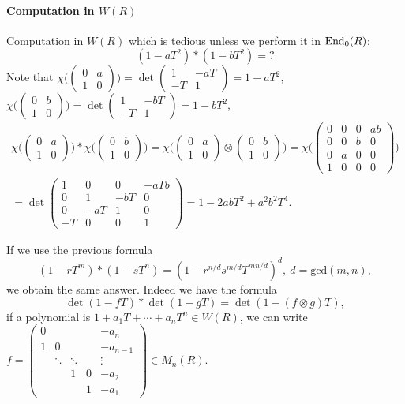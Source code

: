 \paragraph{Computation in $W(R)$}
Computation in $W(R)$ which is tedious unless we perform it in $\mathrm{End}_0(R)$:
\[(1-aT^2)*(1-bT^2)=?\]
Note that $\chi\Big(\begin{pmatrix}
	0&a \\1&0
\end{pmatrix}\Big)=\det \begin{pmatrix}
	1&-aT\\-T &1
\end{pmatrix} =1-aT^2$, $\chi\Big(\begin{pmatrix}
	0&b \\1&0
\end{pmatrix}\Big)=\det \begin{pmatrix}
	1&-bT\\-T &1
\end{pmatrix} =1-bT^2$,
\begin{gather*}
	\chi\Big(\begin{pmatrix}
	0&a \\1&0
\end{pmatrix}\Big)*\chi\Big(\begin{pmatrix}
	0&b \\1&0
\end{pmatrix}\Big)=\chi\Big(\begin{pmatrix}
	0&a \\1&0
\end{pmatrix}\otimes \begin{pmatrix}
	0&b \\1&0
\end{pmatrix} \Big)=\chi \Big(\begin{pmatrix}
	0 &0&0&ab\\0&0&b&0\\0&a&0&0\\1&0&0&0
\end{pmatrix}\Big)\\
=\det \begin{pmatrix}
	1 &0&0&-aTb\\0&1&-bT&0\\0&-aT&1&0\\-T&0&0&1
\end{pmatrix}=1-2abT^2+a^2b^2T^4.
\end{gather*}

If we use the previous formula 
\[(1-rT^m)*(1-sT^n)=(1-r^{n/d}s^{m/d}T^{mn/d})^d,\ d=\mbox{gcd}(m,n),\]
we obtain the same answer. Indeed we have the formula 
\[\det (1-fT)*\det(1-gT)=\det(1-(f\otimes g)T),\]
if a polynomial is $1 + a_1T+ \cdots + a_nT^n\in W(R)$, we can write $f=\begin{pmatrix}
	0& & & & -a_n\\
	1&0& & & -a_{n-1}\\
	 &\ddots&\ddots& &\vdots\\
	 & & 1&0&-a_2\\
	 & & & 1&-a_1 
\end{pmatrix}\in M_n(R)$.

